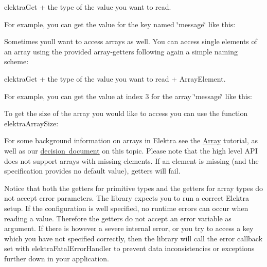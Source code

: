 {\ttfamily elektra\+Get} + the type of the value you want to read.

For example, you can get the value for the key named \char`\"{}message\char`\"{} like this\+:


\begin{DoxyCode}{0}
\end{DoxyCode}


Sometimes you\textquotesingle{}ll want to access arrays as well. You can access single elements of an array using the provided array-\/getters following again a simple naming scheme\+:

{\ttfamily elektra\+Get} + the type of the value you want to read + {\ttfamily Array\+Element}.

For example, you can get the value at index 3 for the array \char`\"{}message\char`\"{} like this\+:


\begin{DoxyCode}{0}
\end{DoxyCode}


To get the size of the array you would like to access you can use the function {\ttfamily elektra\+Array\+Size}\+:


\begin{DoxyCode}{0}
\end{DoxyCode}


For some background information on arrays in Elektra see the \mbox{\hyperlink{doc_tutorials_arrays_md}{Array}} tutorial, as well as our \mbox{\hyperlink{doc_decisions_array_md}{decision document}} on this topic. Please note that the high level A\+PI does not support arrays with missing elements. If an element is missing (and the specification provides no default value), getters will fail.

Notice that both the getters for primitive types and the getters for array types do not accept error parameters. The library expects you to run a correct Elektra setup. If the configuration is well specified, no runtime errors can occur when reading a value. Therefore the getters do not accept an error variable as argument. If there is however a severe internal error, or you try to access a key which you have not specified correctly, then the library will call the error callback set with {\ttfamily elektra\+Fatal\+Error\+Handler} to prevent data inconsistencies or exceptions further down in your application.

